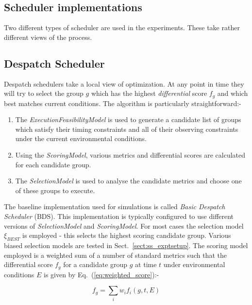 \subsection{Scheduler implementations}
\label{ss:sched_impl}
Two different types of scheduler are used in the experiments. These take rather different views of the process.

\subsection{Despatch Scheduler}
Despatch schedulers take a local view of optimization. At any point in time they will try to select the group $g$ which has the highest \emph{differential} score $f_g$ and which best matches current conditions. The algorithm is particularly straightforward:-

\begin{enumerate} 
\item The \emph{ExecutionFeasibilityModel} is used to generate a candidate list of groups which satisfy their timing constraints and all of their observing constraints under the current environmental conditions.

\item Using the \emph{ScoringModel}, various metrics and differential scores are calculated for each candidate group. 

\item The \emph{SelectionModel} is used to analyse the candidate metrics and choose one of these groups to execute.
\end{enumerate}

The baseline implementation used for simulations is called \emph{Basic Despatch Scheduler} (BDS). This implementation is typically configured to use different versions of \emph{SelectionModel} and \emph{ScoringModel}. For most cases the selection model $\xi_{BEST}$ is employed - this selects the highest scoring candidate group. Various biased selection models are tested in Sect.~\ref{sect:ss_exptsetup}. The scoring model employed is a weighted sum of a number of standard metrics such that the differential score $f_g$ for a candidate group $g$ at time $t$ under environmental conditions $E$ is given by Eq.~(\ref{eq:weighted_score}):-

\begin{equation}
\label{eq:weighted_score}
f_g = \sum_{i} {w_i f_i(g,t,E)}
\end{equation}

